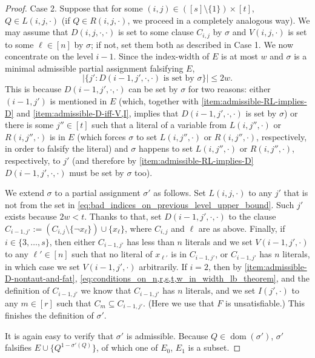 \documentclass[10pt,a4paper]{article}
\theoremstyle{remark}
\newtheorem*{switching lemma}{Switching Lemma}
\newtheorem*{open problem}{Open Problem}
\theoremstyle{definition}
\DeclareMathOperator{\dom}{dom}
\begin{document}
\begin{proof}
Case 2. Suppose that for some $(i,j) \in ([s] \setminus \{1\}) \times [t]$, $Q \in L(i,j, \cdot)$ (if $Q \in R(i,j, \cdot)$, we proceed in a completely analogous way). We may assume that $D(i,j,\cdot, \cdot)$ is set to some clause $C_{i,j}$ by $\sigma$ and $V(i,j,\cdot)$ is set to some $\ell \in [n]$ by $\sigma$; if not, set them both as described in Case 1. We now concentrate on the level $i-1$. Since the index-width of $E$ is at most $w$ and $\sigma$ is a minimal admissible partial assignment falsifying $E$, 
\begin{equation}
\label{eq:bad_indices_on_previous_level_upper_bound}
 \left| \{j': D(i-1,j', \cdot, \cdot) \text{ is set by }  \sigma  \} \right| \leq 2w.
\end{equation}
This is because $D(i-1,j', \cdot, \cdot)$ can be set by $\sigma$ for two reasons: either $(i-1,j')$ is mentioned in $E$ (which, together with \ref{item:admissible-RL-implies-D} and \ref{item:admissible-D-iff-V,I}, implies that $D(i-1,j', \cdot, \cdot)$ is set by $\sigma$) or there is some $j'' \in [t]$ such that a literal of a variable from $L(i,j'', \cdot)$ or $R(i,j'', \cdot)$ is in $E$ (which forces $\sigma$ to set $L(i,j'', \cdot)$ or $R(i,j'', \cdot)$, respectively, in order to falsify the literal) and $\sigma$ happens to set $L(i,j'', \cdot)$ or $R(i,j'', \cdot)$, respectively, to $j'$ (and therefore by \ref{item:admissible-RL-implies-D} $D(i-1,j', \cdot, \cdot)$ must be set by $\sigma$ too).

We extend $\sigma$ to a partial assignment $\sigma'$ as follows. Set $L(i,j, \cdot)$ to any $j'$ that is not from the set in \eqref{eq:bad_indices_on_previous_level_upper_bound}. Such $j'$ exists because $2w < t$. Thanks to that, set $D(i-1,j',\cdot, \cdot)$ to the clause $C_{i-1,j'} := (C_{i,j} \setminus \{\neg x_{\ell}\} ) \cup \{x_{\ell}\}$, where $C_{i,j}$ and $\ell$ are as above. Finally, if $i \in \{3,\ldots, s\}$, then either $C_{i-1,j'}$ has less than $n$ literals and we set $V(i-1,j',\cdot)$ to any $\ell' \in [n]$ such that no literal of $x_{\ell'}$ is in $C_{i-1,j'}$, or $C_{i-1,j'}$ has $n$ literals, in which case we set $V(i-1,j',\cdot)$ arbitrarily. If $i=2$, then by \ref{item:admissible-D-nontaut-and-fat}, \eqref{eq:conditions_on_n,r,s,t,w_in_width_lb_theorem}, and the definition of $C_{i-1,j'}$ we know that $C_{i-1,j'}$ has $n$ literals, and we set $I(j',\cdot)$ to any $m \in [r]$ such that $C_m \subseteq C_{i-1,j'}$. (Here we use that $F$ is unsatisfiable.) This finishes the definition of $\sigma'$. 

It is again easy to verify that $\sigma'$ is admissible. Because $Q \in \dom(\sigma')$, $\sigma'$ falsifies $E \cup \{Q^{1-\sigma'(Q)}\}$, of which one of $E_0$, $E_1$ is a subset. 
\end{proof}	
\end{document}
